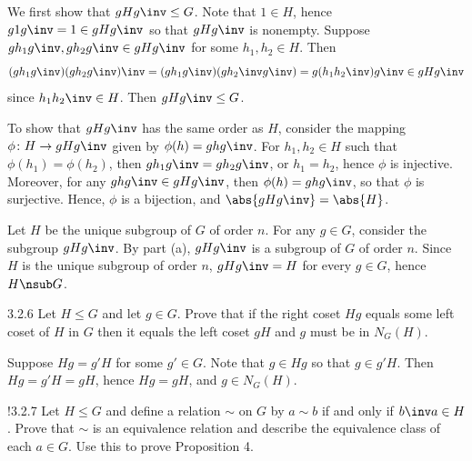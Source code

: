 \begin{solenum}
    \item We first show that $gHg\inv \leq G$.
	Note that $1 \in H$, hence $g1g\inv = 1 \in gHg\inv$ so that $gHg\inv$ is nonempty.
	Suppose $gh_1g\inv, gh_2g\inv \in gHg\inv$ for some $h_1, h_2 \in H$.
	Then
    \[
    	(gh_1g\inv)(gh_2g\inv)\inv = (gh_1g\inv)(gh_2\inv g\inv) = g(h_1h_2\inv)g\inv \in gHg\inv
    \]
    since $h_1h_2\inv \in H$.
	Then $gHg\inv \leq G$.

    To show that $gHg\inv$ has the same order as $H$, consider the mapping $\phi \colon H \to gHg\inv$ given by $\phi(h) = ghg\inv$.
	For $h_1, h_2 \in H$ such that $\phi(h_1) = \phi(h_2)$, then $gh_1g\inv = gh_2g\inv$, or $h_1 = h_2$, hence $\phi$ is injective.
	Moreover, for any $ghg\inv \in gHg\inv$, then $\phi(h) = ghg\inv$, so that $\phi$ is surjective.
	Hence, $\phi$ is a bijection, and $\abs{gHg\inv} = \abs{H}$.
    \item Let $H$ be the unique subgroup of $G$ of order $n$.
	For any $g \in G$, consider the subgroup $gHg\inv$.
	By part (a), $gHg\inv$ is a subgroup of $G$ of order $n$.
	Since $H$ is the unique subgroup of order $n$, $gHg\inv = H$ for every $g \in G$, hence $H \nsub G$.
\end{solenum}

\begin{exercise}{3.2.6}
    Let $H \leq G$ and let $g \in G$.
	Prove that if the right coset $Hg$ equals some left coset of $H$ in $G$ then it equals the left coset $gH$ and $g$ must be in $N_G(H)$.
\end{exercise}

\begin{sol}
    Suppose $Hg = g'H$ for some $g' \in G$.
	Note that $g \in Hg$ so that $g \in g'H$.
	Then $Hg = g'H = gH$, hence $Hg = gH$, and $g \in N_G(H)$.
\end{sol}

\begin{exercise}!{3.2.7}
    Let $H \leq G$ and define a relation $\sim$ on $G$ by $a \sim b$ if and only if $b\inv a \in H$.
	Prove that $\sim$ is an equivalence relation and describe the equivalence class of each $a \in G$.
	Use this to prove Proposition 4.
\end{exercise}

